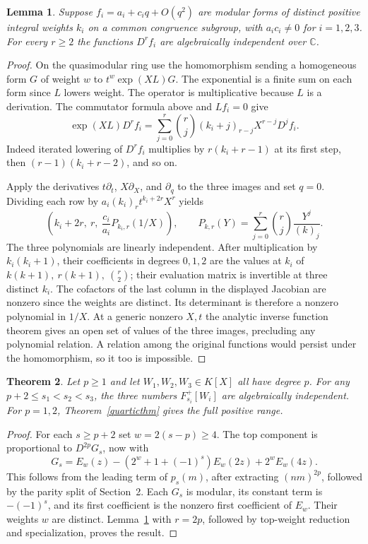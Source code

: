 \documentclass[11pt]{article}
\newtheorem{theorem}{Theorem}
\newtheorem{lemma}[theorem]{Lemma}
\newcommand{\CC}{\mathbb C}
\begin{document}
\begin{lemma}\label{deriv}
Suppose $f_i=a_i+c_iq+O(q^2)$ are modular forms of distinct positive integral weights $k_i$ on a common congruence subgroup, with $a_ic_i\ne0$ for $i=1,2,3$. For every $r\ge2$ the functions $D^rf_i$ are algebraically independent over $\CC$.
\end{lemma}
\begin{proof}
On the quasimodular ring use the homomorphism sending a homogeneous form $G$ of weight $w$ to $t^w\exp(XL)G$. The exponential is a finite sum on each form since $L$ lowers weight. The operator is multiplicative because $L$ is a derivation. The commutator formula above and $Lf_i=0$ give
\[
 \exp(XL)D^rf_i=
 \sum_{j=0}^r \binom rj(k_i+j)_{r-j}X^{r-j}D^j f_i.
\]
Indeed iterated lowering of $D^rf_i$ multiplies by $r(k_i+r-1)$ at its first step, then $(r-1)(k_i+r-2)$, and so on.

\clearpage
Apply the derivatives $t\partial_t$, $X\partial_X$, and $\partial_q$ to the three images and set $q=0$. Dividing each row by $a_i(k_i)_r t^{k_i+2r}X^r$ yields
\[
 \left(k_i+2r,\ r,\ \frac{c_i}{a_i}P_{k_i,r}(1/X)\right),
 \qquad
 P_{k,r}(Y)=\sum_{j=0}^r\binom rj\frac{Y^j}{(k)_j}.
\]
The three polynomials are linearly independent. After multiplication by $k_i(k_i+1)$, their coefficients in degrees $0,1,2$ are the values at $k_i$ of $k(k+1),\ r(k+1),\ \binom r2$; their evaluation matrix is invertible at three distinct $k_i$. The cofactors of the last column in the displayed Jacobian are nonzero since the weights are distinct. Its determinant is therefore a nonzero polynomial in $1/X$. At a generic nonzero $X,t$ the analytic inverse function theorem gives an open set of values of the three images, precluding any polynomial relation. A relation among the original functions would persist under the homomorphism, so it too is impossible.
\end{proof}

\begin{theorem}\label{upperthm}
Let $p\ge1$ and let $W_1,W_2,W_3\in K[X]$ all have degree $p$. For any $p+2\le s_1<s_2<s_3$, the three numbers $F_{s_i}^+[W_i]$ are algebraically independent. For $p=1,2$, Theorem~\ref{quarticthm} gives the full positive range.
\end{theorem}
\begin{proof}
For each $s\ge p+2$ set $w=2(s-p)\ge4$. The top component is proportional to $D^{2p}G_s$, now with
\[
 G_s=E_w(z)-(2^w+1+(-1)^s)E_w(2z)+2^w E_w(4z).
\]
This follows from the leading term of $p_s(m)$, after extracting $(nm)^{2p}$, followed by the parity split of Section~2. Each $G_s$ is modular, its constant term is $-(-1)^s$, and its first coefficient is the nonzero first coefficient of $E_w$. Their weights $w$ are distinct. Lemma~\ref{deriv} with $r=2p$, followed by top-weight reduction and specialization, proves the result.
\end{proof}
\end{document}
